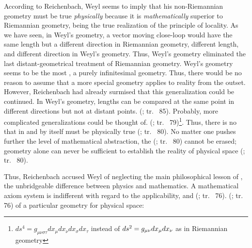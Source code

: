 \documentclass[draft]{article}
\newcommand{\WG}{Weyl's geometry\xspace}
\newcommand{\rhp}[2]{(\cite[#1]{Reichenbach1920a}; tr.\ \citeyear{Reichenbach1969} #2)\xspace}
\begin{document}
According to Reichenbach, Weyl seems to imply that his non-Riemannian geometry must be true \emph{physically} because it is \emph{mathematically} superior to Riemannian geometry, being the true realization of the principle of locality. As we have seen, in \WG, a vector moving close-loop would have the same length but a different direction in Riemannian geometry, different length, and different direction in \WG. Thus, \WG eliminated the last distant-geometrical treatment of Riemannian geometry. \WG seems to be the most , a purely infinitesimal geometry. Thus, there would be no reason to assume that a more special geometry applies to reality from the outset. However, Reichenbach had already surmised that this generalization could be continued. In \WG, lengths can be compared at the same point in different directions but not at distant points.  \rhp{76}{85}. Probably, more complicated generalizations could be thought of.  \rhp{76}{79}\footnote{$d s^{4}=g_{\mu \nu \sigma \tau} d x_{\mu} d x_{\nu} d x_{\sigma} d x_{\tau}$ instead of $d s^{2}=g_{\mu\nu} d x_{\mu} d x_{\nu}$ as in Riemannian geometry}. Thus, there is no  that in and by itself must be physically true \rhp{76}{80}. No matter one pushes further the level of mathematical abstraction, the   \rhp{76}{80} cannot be erased; geometry alone can never be sufficient to establish the reality of physical space \rhp{76}{80}. 

Thus, Reichenbach accused Weyl of neglecting the main philosophical lesson of \gr, the unbridgeable difference between physics and mathematics. A mathematical axiom system is indifferent with regard to the applicability, and  \rhp{73}{76}.  \rhp{73}{76} of a particular geometry for physical space:
\end{document}
